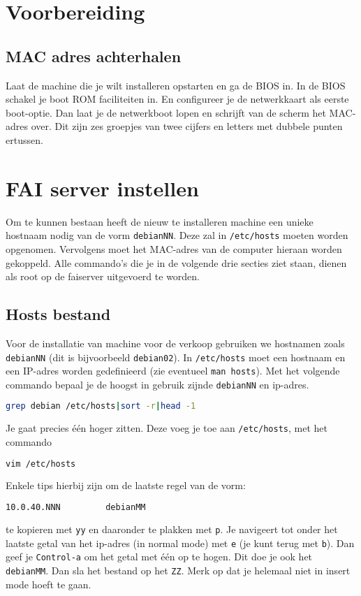 \section{Voorbereiding}
\subsection{MAC adres achterhalen}
Laat de machine die je wilt installeren opstarten en ga de BIOS in. In de BIOS schakel je boot ROM faciliteiten in. En configureer je de netwerkkaart als eerste boot-optie. Dan laat je de netwerkboot lopen en schrijft van de scherm het MAC-adres over. Dit zijn zes groepjes van twee cijfers en letters met dubbele punten ertussen. 

\section{FAI server instellen}
Om te kunnen bestaan heeft de nieuw te installeren machine een unieke hostnaam nodig van de vorm \texttt{debianNN}. Deze zal in \texttt{/etc/hosts} moeten worden opgenomen. Vervolgens moet het MAC-adres van de computer hieraan worden gekoppeld. Alle commando's die je in de volgende drie secties ziet staan, dienen als root op de faiserver uitgevoerd te worden.
\subsection{Hosts bestand}
Voor de installatie van machine voor de verkoop gebruiken we hostnamen zoals \texttt{debianNN} (dit is bijvoorbeeld \texttt{debian02}).
In \texttt{/etc/hosts} moet een hostnaam en een IP-adres worden gedefinieerd (zie eventueel \texttt{man hosts}). Met het volgende commando bepaal je de hoogst in gebruik zijnde \texttt{debianNN} en ip-adres.  
\begin{lstlisting}[language=bash]
grep debian /etc/hosts|sort -r|head -1
\end{lstlisting}
Je gaat precies \'{e}\'{e}n hoger zitten. Deze voeg je toe aan \texttt{/etc/hosts}, met het commando
\begin{lstlisting}[language=bash]
vim /etc/hosts
\end{lstlisting}
Enkele tips hierbij zijn om de laatste regel van de vorm:
\begin{lstlisting}[language=bash]
10.0.40.NNN			debianMM
\end{lstlisting}
te kopieren met \texttt{yy} en daaronder te plakken met \texttt{p}. Je navigeert tot onder het laatste getal van het ip-adres (in normal mode) met \texttt{e} (je kunt terug met \texttt{b}). Dan geef je \texttt{Control-a} om het getal met \'{e}\'{e}n op te hogen. Dit doe je ook het \texttt{debianMM}. Dan sla het bestand op het \texttt{ZZ}. Merk op dat je helemaal niet in insert mode hoeft te gaan.
